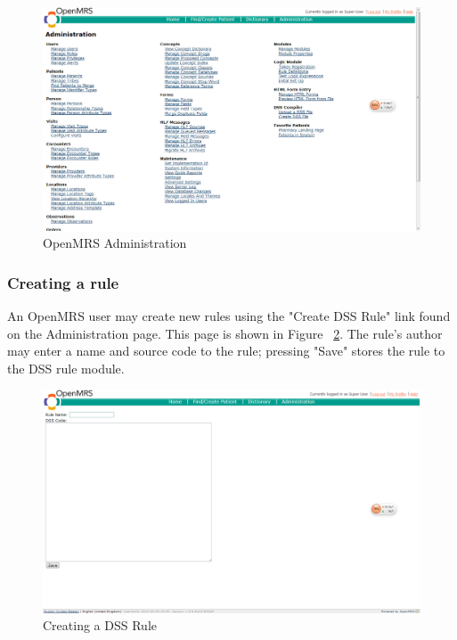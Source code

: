 \documentclass[12pt,letterpaper]{article}
\begin{document}
\begin{figure}\begin{center}
\includegraphics[width=6.5in]{administration.png}
\end{center}
\caption{OpenMRS Administration} \label{fig:ADMINISTRATION}
\end{figure}

\subsubsection{Creating a rule}

An OpenMRS user may create new rules using the "Create DSS Rule" 
link found on the Administration page. This page is shown in 
Figure ~\ref{fig:CREATE_DSS_PROGRAM}. The rule's author may 
enter a name and source code to the rule; pressing "Save" stores 
the rule to the DSS rule module.

\begin{figure}\begin{center}
\includegraphics[width=6.5in]{createDSSProgram.png}
\end{center}
\caption{Creating a DSS Rule} \label{fig:CREATE_DSS_PROGRAM}
\end{figure}
\end{document}
